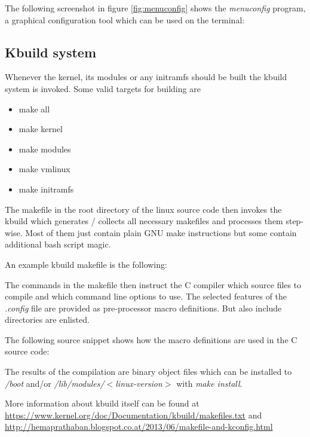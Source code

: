The following screenshot in figure \ref{fig:menuconfig} 
shows the {\it menuconfig} program, 
a graphical configuration tool which can be used on the terminal:

\subsection{Kbuild system}
Whenever the kernel, its modules or any initramfs should be built the kbuild system is invoked. 
Some valid targets for building are
\begin{itemize}
 \item make all
 \item make kernel
 \item make modules
 \item make vmlinux
 \item make initramfs
\end{itemize}

The makefile in the root directory of the linux source code then invokes the kbuild which 
generates / collects all necessary makefiles and processes them step-wise. 
Most of them just contain plain GNU make instructions but some contain additional bash script magic. 

An example kbuild makefile is the following:

  
The commands in the makefile then instruct the C compiler which source files to compile and 
which command line options to use. The selected features of the {\it .config} file are 
provided as pre-processor macro definitions. But also include directories are enlisted. 

The following source snippet shows how the macro definitions are used in the C source code:

The results of the compilation are binary object files which can be installed to 
{\it /boot} and/or {\it /lib/modules/$<$linux-version$>$} with {\it make install}. 

More information about kbuild itself can be found at
\url{https://www.kernel.org/doc/Documentation/kbuild/makefiles.txt}\cite{Kernel_5}
and
\url{http://hemaprathaban.blogspot.co.at/2013/06/makefile-and-kconfig.html}\cite{Kernel_6}

\FloatBarrier
